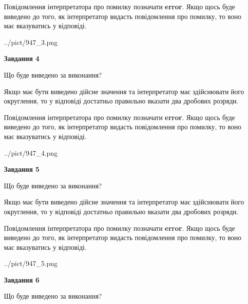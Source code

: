 \documentclass[12pt, ukrainian]{article}
\begin{document}
{\begin {Large}
Повідомлення інтерпретатора про помилку позначати \textbf{error}.
Якщо щось буде виведено до того, як інтерпретатор видасть повідомлення про помилку, 
то воно має вказуватись у відповіді. \par

\begin{center}
	{../pict/947_3.png}
\end{center}
\newpage

{\begin {center}\textbf{Завдання 4}\end {center}}\par
Що буде виведено за виконання? \par

Якщо має бути виведено дійсне значення та інтерпретатор має здійснювати його округлення, 
то у відповіді достатньо правильно вказати два дробових розряди.

Повідомлення інтерпретатора про помилку позначати \textbf{error}.
Якщо щось буде виведено до того, як інтерпретатор видасть повідомлення про помилку, 
то воно має вказуватись у відповіді. \par

\begin{center}
	{../pict/947_4.png}
\end{center}
\newpage

{\begin {center}\textbf{Завдання 5}\end {center}}\par
Що буде виведено за виконання? \par

Якщо має бути виведено дійсне значення та інтерпретатор має здійснювати його округлення, 
то у відповіді достатньо правильно вказати два дробових розряди.

Повідомлення інтерпретатора про помилку позначати \textbf{error}.
Якщо щось буде виведено до того, як інтерпретатор видасть повідомлення про помилку, 
то воно має вказуватись у відповіді. \par

\begin{center}
	{../pict/947_5.png}
\end{center}
\newpage

{\begin {center}\textbf{Завдання 6}\end {center}}\par
Що буде виведено за виконання? \par


\end{Large}}
\end{document}

